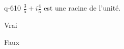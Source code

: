 \begin{truefalse}{q-610}
$\frac{3}{5}+i\frac{4}{5}$ est une racine de l'unité.
\item Vrai
\item* Faux
\end{truefalse}


